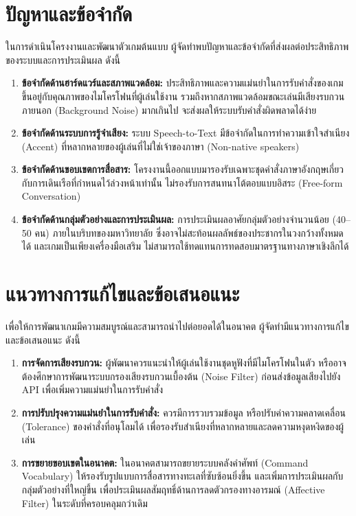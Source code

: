 \section{ปัญหาและข้อจำกัด}

ในการดำเนินโครงงานและพัฒนาตัวเกมต้นแบบ ผู้จัดทำพบปัญหาและข้อจำกัดที่ส่งผลต่อประสิทธิภาพของระบบและการประเมินผล ดังนี้

\begin{enumerate}[label=\arabic*)]
    \item \textbf{ข้อจำกัดด้านฮาร์ดแวร์และสภาพแวดล้อม:} ประสิทธิภาพและความแม่นยำในการรับคำสั่งของเกมขึ้นอยู่กับคุณภาพของไมโครโฟนที่ผู้เล่นใช้งาน รวมถึงหากสภาพแวดล้อมขณะเล่นมีเสียงรบกวนภายนอก (Background Noise) มากเกินไป จะส่งผลให้ระบบรับคำสั่งผิดพลาดได้ง่าย
    \item \textbf{ข้อจำกัดด้านระบบการรู้จำเสียง:} ระบบ Speech-to-Text มีข้อจำกัดในการทำความเข้าใจสำเนียง (Accent) ที่หลากหลายของผู้เล่นที่ไม่ใช่เจ้าของภาษา (Non-native speakers) 
    \item \textbf{ข้อจำกัดด้านขอบเขตการสื่อสาร:} โครงงานนี้ออกแบบมารองรับเฉพาะชุดคำสั่งภาษาอังกฤษเกี่ยวกับการเดินเรือที่กำหนดไว้ล่วงหน้าเท่านั้น ไม่รองรับการสนทนาโต้ตอบแบบอิสระ (Free-form Conversation)
    \item \textbf{ข้อจำกัดด้านกลุ่มตัวอย่างและการประเมินผล:} การประเมินผลอาศัยกลุ่มตัวอย่างจำนวนน้อย (40–50 คน) ภายในบริบทของมหาวิทยาลัย ซึ่งอาจไม่สะท้อนผลลัพธ์ของประชากรในวงกว้างทั้งหมดได้ และเกมเป็นเพียงเครื่องมือเสริม ไม่สามารถใช้ทดแทนการทดสอบมาตรฐานทางภาษาเชิงลึกได้
\end{enumerate}

\section{แนวทางการแก้ไขและข้อเสนอแนะ}

เพื่อให้การพัฒนาเกมมีความสมบูรณ์และสามารถนำไปต่อยอดได้ในอนาคต ผู้จัดทำมีแนวทางการแก้ไขและข้อเสนอแนะ ดังนี้

\begin{enumerate}[label=\arabic*)]
    \item \textbf{การจัดการเสียงรบกวน:} ผู้พัฒนาควรแนะนำให้ผู้เล่นใช้งานชุดหูฟังที่มีไมโครโฟนในตัว หรืออาจต้องศึกษาการพัฒนาระบบกรองเสียงรบกวนเบื้องต้น (Noise Filter) ก่อนส่งข้อมูลเสียงไปยัง API เพื่อเพิ่มความแม่นยำในการรับคำสั่ง
    \item \textbf{การปรับปรุงความแม่นยำในการรับคำสั่ง:} ควรมีการรวบรวมข้อมูล หรือปรับค่าความคลาดเคลื่อน (Tolerance) ของคำสั่งที่อนุโลมได้ เพื่อรองรับสำเนียงที่หลากหลายและลดความหงุดหงิดของผู้เล่น
    \item \textbf{การขยายขอบเขตในอนาคต:} ในอนาคตสามารถขยายระบบคลังคำศัพท์ (Command Vocabulary) ให้รองรับรูปแบบการสื่อสารทางทะเลที่ซับซ้อนยิ่งขึ้น และเพิ่มการประเมินผลกับกลุ่มตัวอย่างที่ใหญ่ขึ้น เพื่อประเมินผลสัมฤทธิ์ด้านการลดตัวกรองทางอารมณ์ (Affective Filter) ในระดับที่ครอบคลุมกว่าเดิม
\end{enumerate}